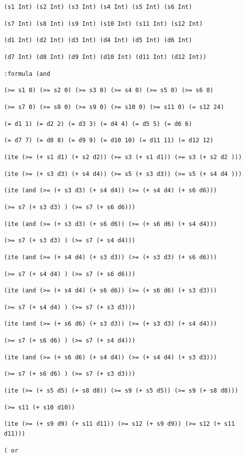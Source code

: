 \documentclass[11pt]{article}
\begin{document}
{{{\tt (s1 Int) (s2 Int) (s3 Int) (s4 Int) (s5 Int) (s6 Int)}

{\tt (s7 Int) (s8 Int) (s9 Int) (s10 Int) (s11 Int) (s12 Int)}

{\tt (d1 Int) (d2 Int) (d3 Int) (d4 Int) (d5 Int) (d6 Int)}

{\tt (d7 Int) (d8 Int) (d9 Int) (d10 Int) (d11 Int) (d12 Int))}

{\tt :formula (and}

{\tt (>= s1 0) (>= s2 0) (>= s3 0) (>= s4 0) (>= s5 0) (>= s6 0)}

{\tt (>= s7 0) (>= s8 0) (>= s9 0) (>= s10 0) (>= s11 0) (= s12 24)}

{\tt (= d1 1) (= d2 2) (= d3 3) (= d4 4) (= d5 5) (= d6 6)}

{\tt (= d7 7) (= d8 8) (= d9 9) (= d10 10) (= d11 11) (= d12 12)}

{\tt (ite (>= (+ s1 d1) (+ s2 d2))  (>= s3 (+ s1 d1))  (>= s3 (+ s2 d2 )))}

{\tt (ite (>= (+ s3 d3) (+ s4 d4))  (>= s5 (+ s3 d3))  (>= s5 (+ s4 d4 )))}

{\tt (ite (and (>= (+ s3 d3) (+ s4 d4)) (>= (+ s4 d4) (+ s6 d6))) }

{\tt (>= s7 (+ s3 d3) ) (>= s7 (+ s6 d6)))}

{\tt (ite (and (>= (+ s3 d3) (+ s6 d6)) (>= (+ s6 d6) (+ s4 d4)))}

{\tt (>= s7 (+ s3 d3) ) (>= s7 (+ s4 d4)))}

{\tt (ite (and (>= (+ s4 d4) (+ s3 d3)) (>= (+ s3 d3) (+ s6 d6))) }

{\tt (>= s7 (+ s4 d4) ) (>= s7 (+ s6 d6)))}

{\tt (ite (and (>= (+ s4 d4) (+ s6 d6)) (>= (+ s6 d6) (+ s3 d3))) }

{\tt (>= s7 (+ s4 d4) ) (>= s7 (+ s3 d3)))}

{\tt (ite (and (>= (+ s6 d6) (+ s3 d3)) (>= (+ s3 d3) (+ s4 d4))) }

{\tt (>= s7 (+ s6 d6) ) (>= s7 (+ s4 d4)))}

{\tt (ite (and (>= (+ s6 d6) (+ s4 d4)) (>= (+ s4 d4) (+ s3 d3))) }

{\tt (>= s7 (+ s6 d6) ) (>= s7 (+ s3 d3)))}

{\tt (ite (>= (+ s5 d5) (+ s8 d8)) (>= s9 (+ s5 d5)) (>= s9 (+ s8 d8)))}

{\tt (>= s11 (+ s10 d10))}

{\tt (ite (>= (+ s9 d9) (+ s11 d11)) (>= s12 (+ s9 d9)) (>= s12 (+ s11 d11)))}

{\tt ( or}

}}
\end{document}
